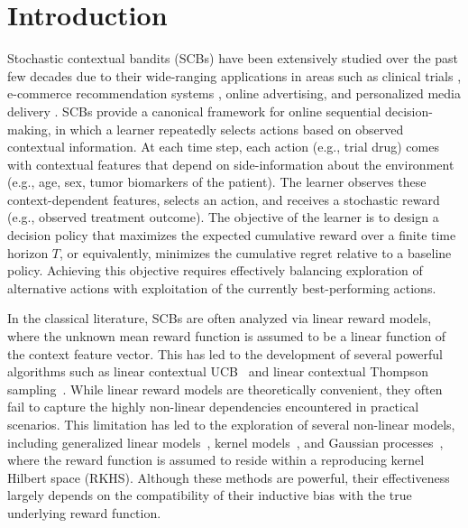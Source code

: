 \documentclass[pdflatex,sn-mathphys-num]{sn-jnl}%
\theoremstyle{thmstyleone}%
\theoremstyle{thmstyletwo}%
\theoremstyle{thmstylethree}%
\begin{document}
\section{Introduction}\label{sec1}
Stochastic contextual bandits (SCBs) have been extensively studied over the past few decades due to their wide-ranging applications in areas such as clinical trials \cite{tewari2017ads,varatharajah2022contextual}, e-commerce recommendation systems \cite{li2010contextual,tang2014ensemble}, online advertising, and personalized media delivery \cite{bouneffouf2012contextual}. SCBs provide a canonical framework for online sequential decision-making, in which a learner repeatedly selects actions based on observed contextual information. At each time step, each action (e.g., trial drug) comes with contextual features that depend on side-information about the environment (e.g., age, sex, tumor biomarkers of the patient).  The learner observes these context-dependent features, selects an action, and receives a stochastic reward (e.g., observed treatment outcome). The objective of the learner is to design a decision policy that maximizes the expected cumulative reward over a finite time horizon $T$, or equivalently, minimizes the cumulative regret relative to a baseline policy. Achieving this objective requires effectively balancing exploration of alternative actions with exploitation of the currently best-performing actions.

In the classical literature, SCBs are often analyzed via linear reward models, where the unknown mean reward function is assumed to be a linear function of the context feature vector. This has led to the development of several powerful algorithms such as linear contextual UCB~\cite{linucb2011,chu2011contextual} and linear contextual Thompson sampling~\cite{agrawal2013thompson, oh2019thompson}. While linear reward models are theoretically convenient, they  often fail to capture the highly non-linear dependencies encountered in practical scenarios. This limitation has led to the exploration of several non-linear models, including generalized linear models~\cite{filippi2010parametric, li2017provably}, kernel models~\cite{valko2013finite}, and Gaussian processes~\cite{Srinivas_2012}, where the reward function is assumed to reside within a reproducing kernel Hilbert space (RKHS). Although these methods are powerful, their effectiveness largely depends on the compatibility of their inductive bias with the true underlying reward function. 
\end{document}
